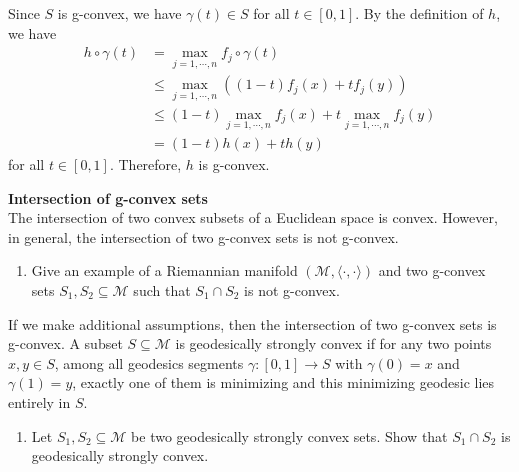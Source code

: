 \documentclass[en, oneside]{assignment}
\begin{document}
\begin{sol}
\begin{enumerate}[label=(\arabic*)]
        Since $S$ is g-convex, we have $\gamma(t) \in S$ for all $t \in [0, 1]$. By the definition of $h$, we have
        \begin{align*}
            h \circ \gamma(t) &= \max_{j=1, \cdots, n} f_j \circ \gamma(t) \\
            &\leq \max_{j=1, \cdots, n} ( (1-t) f_j(x) + t f_j(y) ) \\
            &\leq (1-t) \max_{j=1, \cdots, n} f_j(x) + t \max_{j=1, \cdots, n} f_j(y) \\
            &= (1-t) h(x) + t h(y)
        \end{align*}
        for all $t \in [0, 1]$. Therefore, $h$ is g-convex.
    \end{enumerate}
\end{sol}

\begin{prob} \textbf{Intersection of g-convex sets}\\
    The intersection of two convex subsets of a Euclidean space is convex. However, in general, the intersection of two g-convex sets is not g-convex.
    \begin{enumerate}[label=(\arabic*)]
        \item Give an example of a Riemannian manifold $(\mathcal M, \langle \cdot, \cdot \rangle)$ and 
        two g-convex sets $S_1, S_2 \subseteq \mathcal M$ such that $S_1 \cap S_2$ is not g-convex.
    \end{enumerate}
    If we make additional assumptions, then the intersection of two g-convex sets is g-convex. 
    A subset $S \subseteq \mathcal M$ is geodesically strongly convex if for any two points $x, y \in S$, 
    among all geodesics segments $\gamma : [0, 1] \rightarrow S$ with $\gamma(0) = x$ and $\gamma(1) = y$, 
    exactly one of them is minimizing and this minimizing geodesic lies entirely in $S$.
    \begin{enumerate}[label=(\arabic*), resume]
        \item Let $S_1, S_2 \subseteq \mathcal M$ be two geodesically strongly convex sets. Show that $S_1 \cap S_2$ is geodesically strongly convex.
    \end{enumerate}
    
\end{prob}
\end{document}
